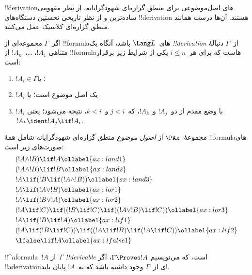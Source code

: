 \documentclass[../../../include/open-logic-section]{subfiles}
\begin{document}


!!{derivation}های اصل‌موضوعی برای منطق گزاره‌ای شهودگرایانه، از نظر
مفهومی ساده‌ترین و از نظر تاریخی نخستین دستگاه‌های !!{derivation}
هستند. آن‌ها درست همانند منطق گزاره‌ای کلاسیک عمل می‌کنند.

\begin{defn}[!!^{derivability}]
اگر~$\Gamma$ مجموعه‌ای از !!{formula}های~$\Lang L$ باشد، آنگاه یک
\emph{!!{derivation}} از~$\Gamma$ دنبالهٔ متناهی
$!A_1$، \dots،~$!A_n$ از !!{formula}هاست که برای هر~$i \le n$ یکی از
شرایط زیر برقرار است:
\begin{enumerate}
\item $!A_i \in \Gamma$؛ یا
\item $!A_i$ یک اصل موضوع است؛ یا
\item $!A_i$ با وضع مقدم از دو~$!A_j$ و~$!A_k$، که~$j < i$ و~$k < i$،
  نتیجه می‌شود؛ یعنی~$!A_k \ident !A_j \lif !A_i$.
\end{enumerate}
\end{defn}

\begin{defn}
مجموعهٔ~$\PAx$ از \emph{اصول موضوع} منطق گزاره‌ای شهودگرایانه شامل همهٔ
!!{formula}های صورت‌های زیر است:
\begin{align}
  & (!A \land !B) \lif !A \ollabel{ax:land1}\\
  & (!A \land !B) \lif !B \ollabel{ax:land2}\\
  & !A \lif (!B \lif (!A \land !B)) \ollabel{ax:land3}\\
  & !A \lif (!A \lor !B) \ollabel{ax:lor1}\\
  & !A \lif (!B \lor !A) \ollabel{ax:lor2}\\
  & (!A \lif !C) \lif ((!B \lif !C) \lif ((!A \lor !B) \lif !C)) \ollabel{ax:lor3}\\
  & !A \lif (!B \lif !A) \ollabel{ax:lif1}\\
  & (!A \lif (!B \lif !C)) \lif ((!A \lif !B) \lif (!A \lif !C)) \ollabel{ax:lif2}\\
  & \lfalse \lif !A \ollabel{ax:lfalse1}
\end{align}
\end{defn}

\begin{defn}[!!^{derivability}]
!!^a{formula}~$!A$ از~$\Gamma$ \emph{!!{derivable}} است، که می‌نویسیم
$\Gamma \Proves !A$، اگر !!a{derivation}ای از~$\Gamma$ وجود داشته
باشد که به~$!A$ پایان یابد.
\end{defn}
\end{document}
